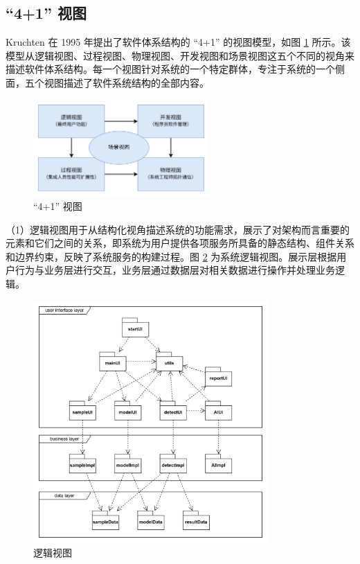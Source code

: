 \documentclass[
  ]{njuthesis}
\begin{document}
\subsection{“4+1” 视图}

Kruchten 在 1995 年提出了软件体系结构的 “4+1” 的视图模型，如图 \ref{4+1视图} 所示。该模型从逻辑视图、过程视图、物理视图、开发视图和场景视图这五个不同的视角来描述软件体系结构。每一个视图针对系统的一个特定群体，专注于系统的一个侧面，五个视图描述了软件系统结构的全部内容\cite{[15]}。

\begin{figure}[htb]
    \centering
    \includegraphics[width=0.6\textwidth]{images/4+1视图.png}
    \caption{“4+1” 视图}
    \label{4+1视图}
\end{figure}

（1）逻辑视图用于从结构化视角描述系统的功能需求，展示了对架构而言重要的元素和它们之间的关系，即系统为用户提供各项服务所具备的静态结构、组件关系和边界约束，反映了系统服务的构建过程。图 \ref{逻辑视图} 为系统逻辑视图。展示层根据用户行为与业务层进行交互，业务层通过数据层对相关数据进行操作并处理业务逻辑。

\begin{figure}[H]
    \centering
    \includegraphics[width=0.8\textwidth]{images/逻辑视图.png}
    \caption{逻辑视图}
    \label{逻辑视图}
\end{figure}
\end{document}

